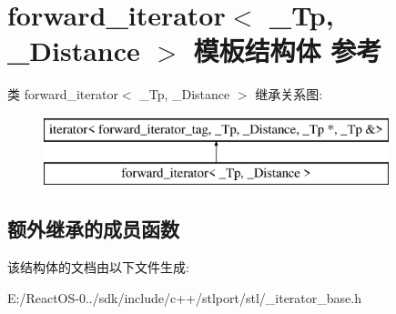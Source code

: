 \hypertarget{structforward__iterator}{}\section{forward\+\_\+iterator$<$ \+\_\+\+Tp, \+\_\+\+Distance $>$ 模板结构体 参考}
\label{structforward__iterator}
类 forward\+\_\+iterator$<$ \+\_\+\+Tp, \+\_\+\+Distance $>$ 继承关系图\+:\begin{figure}[H]
\begin{center}
\leavevmode
\includegraphics[height=2.000000cm]{structforward__iterator}
\end{center}
\end{figure}
\subsection*{额外继承的成员函数}


该结构体的文档由以下文件生成\+:\begin{DoxyCompactItemize}
\item 
E\+:/\+React\+O\+S-\/0../sdk/include/c++/stlport/stl/\+\_\+iterator\+\_\+base.\+h\end{DoxyCompactItemize}
